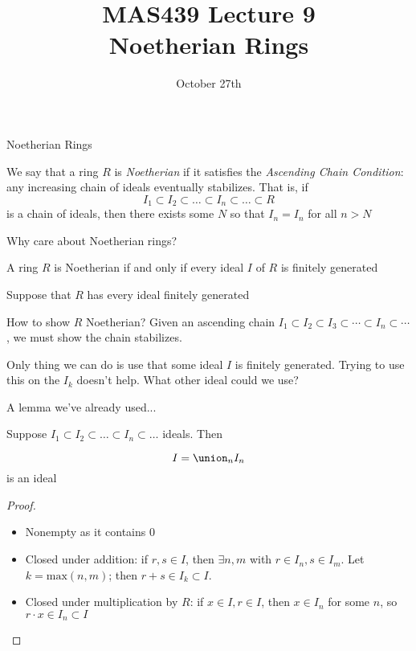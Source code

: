 \documentclass{beamer}
\title{MAS439 Lecture 9 \\ Noetherian Rings}
\date{October 27th}
\begin{document}
\begin{frame}
\titlepage
\end{frame}

\begin{frame}{Noetherian Rings}

\begin{definition} We say that a ring $R$ is \emph{Noetherian} if it satisfies the \emph{Ascending Chain Condition}: any increasing chain of ideals eventually stabilizes.  That is, if
$$I_1\subset I_2\subset \dots\subset I_n\subset\dots \subset R$$
is a chain of ideals, then there exists some $N$ so that $I_n=I_n$ for all $n>N$
\end{definition}




\end{frame}
\begin{frame}{Why care about Noetherian rings?}

\begin{lemma}
A ring $R$ is Noetherian if and only if every ideal $I$ of $R$ is finitely generated
\end{lemma}


\end{frame}

\begin{frame}{Suppose that $R$ has every ideal finitely generated}

\begin{block}{How to show $R$ Noetherian?}
Given an ascending chain $I_1\subset I_2\subset I_3\subset\cdots \subset I_n\subset \cdots $, we must show the chain stabilizes.
\end{block}

Only thing we can do is use that some ideal $I$ is finitely generated.  Trying to use this on the $I_k$ doesn't help.  What other ideal could we use?






\end{frame}

\begin{frame}{A lemma we've already used...}

\begin{lemma}
Suppose $I_1\subset I_2\subset\dots\subset I_n\subset\dots$ ideals.  Then

$$I=\union_n I_n$$ is an ideal
\end{lemma}

\begin{proof}
\begin{itemize}
\item Nonempty as it contains $0$
\item Closed under addition: if $r,s\in I$, then $\exists n,m$ with $r\in I_n, s\in I_m$.  Let $k=\textrm{max}(n,m)$; then $r+s\in I_k\subset I$.
\item Closed under multiplication by $R$: if $x\in I, r\in I$, then $x\in I_n$ for some $n$, so $r\cdot x\in I_n\subset I$
\end{itemize}
\end{proof}
\end{frame}
\end{document}
